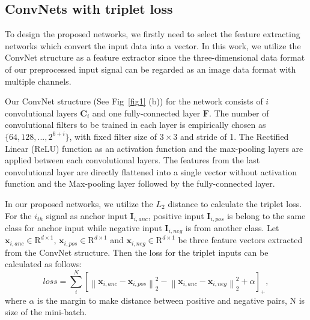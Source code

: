 \documentclass[runningheads]{llncs}
\begin{document}
\subsection{ConvNets with triplet loss}

To design the proposed networks, we firstly need to select the feature extracting networks which convert the input data into a vector. In this work, we utilize the ConvNet structure \cite{lecun1998gradient} as a feature extractor since the three-dimensional data format of our preprocessed input signal can be regarded as an image data format with multiple channels. 

Our ConvNet structure (See Fig~\ref{fig1} (b)) for the network consists of $i$ convolutional layers $\mathbf{C}_{i}$ and one fully-connected layer $\mathbf{F}$. The number of convolutional filters to be trained in each layer is empirically chosen as $\{64, 128, ...,  2^{6+i}\}$, with fixed filter size of $3\times3$ and stride of 1. The Rectiﬁed Linear (ReLU) function as an activation function and the max-pooling layers are applied between each convolutional layers. The features from the last convolutional layer are directly flattened into a single vector without activation function and the Max-pooling layer followed by the fully-connected layer.

In our proposed networks, we utilize the $L_2$ distance to calculate the triplet loss. For the $i_{th}$ signal as anchor input $\mathbf{I}_{i,anc}$, positive input $\mathbf{I}_{i,pos}$ is belong to the same class for anchor input while negative input $\mathbf{I}_{i,neg}$ is from another class.
Let $\mathbf{x}_{i,anc}\in{\mathrm{R}}^{d\times1}$, $\mathbf{x}_{i,pos}\in{\mathrm{R}}^{d\times1}$ and $\mathbf{x}_{i,neg}\in{\mathrm{R}}^{d\times1}$ be three feature vectors extracted from the ConvNet structure. Then the loss for the triplet inputs can be calculated as follows:
\begin{equation}
loss = \sum_i^N { \left[ {\left\| {{\mathbf{x}_{i,anc}} - {\mathbf{x}_{i,pos}}} \right\|_2^2} -
{\left\| {{\mathbf{x}_{i,anc}} - {\mathbf{x}_{i,neg}}} \right\|_2^2}  + \alpha \right]_+},
\end{equation} 
where $\alpha$ is the margin to make distance between positive and negative pairs, N is size of the mini-batch. 

\end{document}
